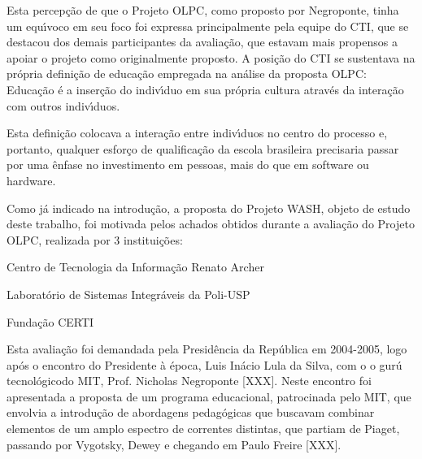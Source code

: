 \documentclass[
12pt,		%
openright,	%
twoside,  %
a4paper,			%
chapter=TITLE,		%
english,			%
french,				%
spanish,			%
brazil				%
]{USPSC-classe/USPSC}
\begin{document}
Esta percep\c{c}\~ao de que o Projeto OLPC, como proposto por Negroponte, tinha um equ\'{\i}voco em seu foco foi expressa principalmente pela equipe do CTI, que se destacou dos demais participantes da avalia\c{c}\~ao, que estavam mais propensos a apoiar o projeto como originalmente proposto. A posi\c{c}\~ao do CTI se sustentava na pr\'opria defini\c{c}\~ao de educa\c{c}\~ao empregada na an\'alise da proposta OLPC: \textquotedbl Educa\c{c}\~ao \'e a inser\c{c}\~ao do indiv\'{\i}duo em sua pr\'opria cultura atrav\'es da intera\c{c}\~ao com outros indiv\'{\i}duos.














Esta defini\c{c}\~ao colocava a intera\c{c}\~ao entre indiv\'{\i}duos no centro do processo e, portanto, qualquer esfor\c{c}o de qualifica\c{c}\~ao da escola brasileira precisaria passar por uma \^enfase no investimento em \textquotedbl pessoas, mais do que em software ou hardware\textquotedbl .














Como j\'a indicado na introdu\c{c}\~ao, a proposta do Projeto WASH, objeto de estudo deste trabalho, foi motivada pelos achados obtidos durante a avalia\c{c}\~ao do Projeto OLPC, realizada por 3 institui\c{c}\~oes:















\begin{alineas}
\item Centro de Tecnologia da Informa\c{c}\~ao Renato Archer
\item Laborat\'orio de Sistemas Integr\'aveis da Poli-USP
\item Funda\c{c}\~ao CERTI
\end{alineas}

Esta avalia\c{c}\~ao foi demandada pela Presid\^encia da Rep\'ublica em 2004-2005, logo ap\'os o encontro do Presidente \`a \'epoca, Luis In\'acio Lula da Silva, com o o \textquotedbl gur\'u tecnol\'ogico\textquotedbl  do MIT, Prof. Nicholas Negroponte [XXX]. Neste encontro foi apresentada a proposta de um programa educacional, patrocinada pelo MIT, que envolvia a introdu\c{c}\~ao de abordagens pedag\'ogicas que buscavam combinar elementos de um amplo espectro de correntes distintas, que partiam de Piaget, passando por Vygotsky, Dewey e chegando em Paulo Freire [XXX].
\end{document}
